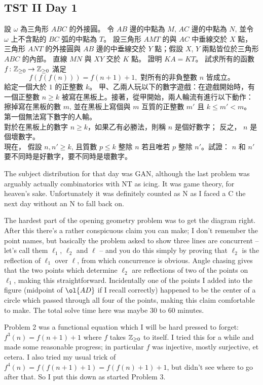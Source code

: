 \documentclass[11pt]{scrreprt}
\begin{document}
\subsection{TST II Day 1}
\begin{enumerate}
  \ii 設 $\omega$ 為三角形 $ABC$ 的外接圓。 令 $AB$ 邊的中點為 $M$, $AC$ 邊的中點為 $N$, 並令 $\omega$ 上不含點的 $BC$ 弧的中點為 $T$。
  設三角形 $AMT$ 的與 $AC$ 中垂線交於 $X$ 點， 三角形 $ANT$ 的外接圓與 $AB$ 邊的中垂線交於 $Y$ 點；假設 $X$, $Y$ 兩點皆位於三角形 $ABC$ 的內部。
  直線 $MN$ 與 $XY$ 交於 $K$ 點。 證明 $KA=KT$。 %
  \ii 試求所有的函數 $f\colon \mathbb Z_{\ge 0} \to \mathbb Z_{\ge 0}$ 滿足
  \[ f(f(f(n))) = f(n+1)+1, \text{ 對所有的非負整數 $n$ 皆成立。} \]
  \ii 給定一個大於 $1$ 的正整數 $k$。 甲、乙兩人玩以下的數字遊戲：在遊戲開始時，有一個正整數 $n \ge k$ 被寫在黑板上。接著，從甲開始，兩人輪流有進行以下動作：擦掉寫在黑板的數 $m$, 並在黑板上寫個與 $m$ 互質的正整數 $m'$ 且 $k \le m' < m$。
  第一個無法寫下數字的人輸。 \\
  對於在黑板上的數字 $n \ge k$，如果乙有必勝法，則稱 $n$ 是個好數字； 反之， $n$ 是個壞數字。 \\
  現在， 假設 $n,n' \ge k$, 且質數 $p \le k$ 整除 $n$ 若且唯若 $p$ 整除 $n'$。試證： $n$ 和 $n'$ 要不同時是好數字，要不同時是壞數字。 %
\end{enumerate}
The subject distribution for that day was GAN,
although the last problem was arguably actually combinatorics with NT as icing.
It was game theory, for heaven's sake.
Unfortunately it was definitely counted as N as I faced a C the next day without an N to fall back on.

The hardest part of the opening geometry problem was to get the diagram right.
After this there's a rather conspicuous claim you can make; I don't remember the point names,
but basically the problem asked to show three lines are concurrent -- let's call them $\ell_1$,
$\ell_2$ and $\ell$ -- and you do this simply by proving that $\ell_2$ is the
reflection of $\ell_1$ over $\ell$, from which concurrence is obvious.
Angle chasing gives that the two points which determine $\ell_2$ are reflections
of two of the points on $\ell_1$, making this straightforward.
Incidentally one of the points I added into the figure (midpoint of $\ol{AD}$ if
I recall correctly) happened to be the center of a circle which passed through all four of the points,
making this claim comfortable to make. The total solve time here was maybe 30 to 60 minutes.

Problem 2 was a functional equation which I will be hard pressed to forget:
$f^3(n)=f(n+1)+1$ where $f$ takes $\mathbb Z_{\ge 0}$ to itself.
I tried this for a while and made some reasonable progress; in particular $f$ was injective,
mostly surjective, et cetera.
I also tried my usual trick of $f^4(n) = f(f(n+1)+1) = f(f(n)+1)+1$, but didn't see where to go after that.
So I put this down as started Problem 3.
\end{document}
